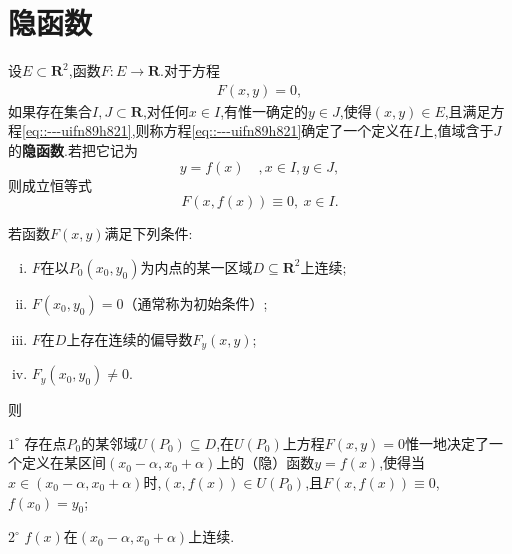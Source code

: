 \documentclass[../../main.tex]{subfiles}%
\begin{document}
\section{隐函数}

\begin{definition}
设$E \subset \mathbf{R}^2$,函数$F:E \to \mathbf{R}$.对于方程
\begin{align}
F(x,y) = 0, \label{eq::---uifn89h821}
\end{align}
如果存在集合$I,J \subset \mathbf{R}$,对任何$x \in I$,有惟一确定的$y \in J$,使得$(x,y) \in E$,且满足方程\eqref{eq::---uifn89h821},则称方程\eqref{eq::---uifn89h821}确定了一个定义在$I$上,值域含于$J$的\textbf{隐函数}.若把它记为
\[
y = f(x) \quad , x \in I, y \in J,
\]
则成立恒等式
\[
F(x,f(x)) \equiv 0,\ x \in I.
\]
\end{definition}

\begin{theorem}[隐函数存在唯一性定理]\label{theorem:隐函数存在唯一性定理}
若函数$F(x,y)$满足下列条件:
\begin{enumerate}[(i)]
\item $F$在以$P_0(x_0,y_0)$为内点的某一区域$D \subseteq \mathbf{R}^2$上连续;
\item $F(x_0,y_0) = 0$（通常称为初始条件）;
\item $F$在$D$上存在连续的偏导数$F_y(x,y)$;
\item $F_y(x_0,y_0) \neq 0$.
\end{enumerate}
则

$1^\circ$ 存在点$P_0$的某邻域$U(P_0) \subseteq D$,在$U(P_0)$上方程$F(x,y) = 0$惟一地决定了一个定义在某区间$(x_0-\alpha,x_0+\alpha)$上的（隐）函数$y = f(x)$,使得当$x \in (x_0-\alpha,x_0+\alpha)$时,$(x,f(x)) \in U(P_0)$,且$F(x,f(x)) \equiv 0$,$f(x_0) = y_0$;

$2^\circ$ $f(x)$在$(x_0-\alpha,x_0+\alpha)$上连续.
\end{theorem}
\end{document}
